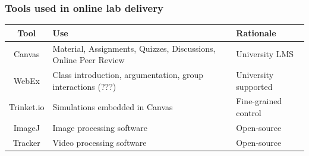 \documentclass[aspectratio=169,shadow=true]{beamer}
\begin{document}
{\nologo
  \begin{frame}
    \frametitle{Tools used in online lab delivery}
    \begin{center}
      \renewcommand{\arraystretch}{1.5}
      \begin{tabular}{cll}
        \hline\hline
        \textbf{Tool} & \textbf{Use} & \textbf{Rationale} \\
        \hline
        Canvas & \parbox[t]{2in}{\raggedright Material, Assignments, Quizzes, Discussions,
                 Online Peer Review }& University LMS\\
        WebEx & \parbox[t]{2in}{\raggedright Class introduction, argumentation, group interactions (???)} & University supported\\
        Trinket.io & \parbox[t]{2in}{\raggedright Simulations embedded in Canvas} &
                                                                                    Fine-grained
                                                                                    control\\
        ImageJ &Image processing software &Open-source \\
        Tracker &Video processing software &Open-source \\
        \hline\hline
      \end{tabular}
    \end{center}
  \end{frame}
}
\end{document}
